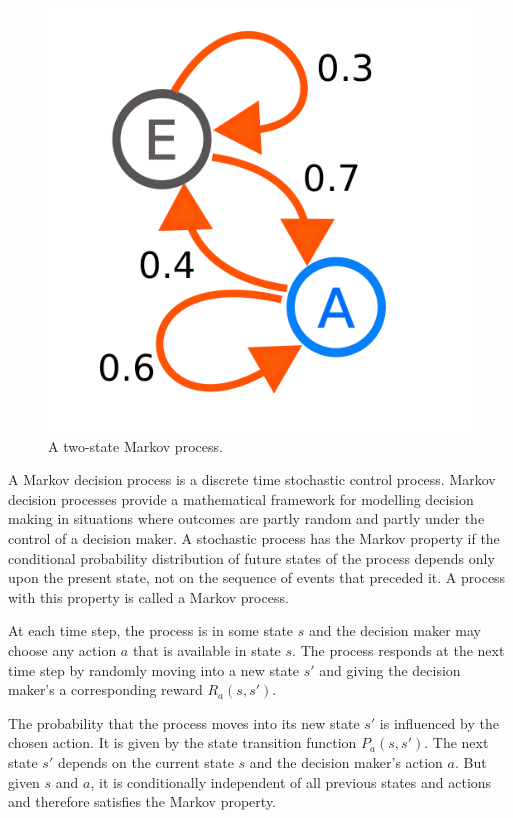 \documentclass[]{article}
\begin{document}
\begin{figure}[H]
	\includegraphics[scale=0.13]{markov}
	\centering
	\caption{A two-state Markov process.}
\end{figure}

A Markov decision process is a discrete time stochastic control process. Markov decision processes provide a mathematical framework for modelling decision making in situations where outcomes are partly random and partly under the control of a decision maker. A stochastic process has the Markov property if the conditional probability distribution of future states of the process depends only upon the present state, not on the sequence of events that preceded it. A process with this property is called a Markov process.

At each time step, the process is in some state $s$ and the decision maker may choose any action $a$ that is available in state $s$. The process responds at the next time step by randomly moving into a new state $s'$ and giving the decision maker's a corresponding reward $R_a(s, s')$.

The probability that the process moves into its new state $s'$ is influenced by the chosen action. It is given by the state transition function $P_a(s, s')$. The next state $s'$ depends on the current state $s$ and the decision maker's action $a$. But given $s$ and $a$, it is conditionally independent of all previous states and actions and therefore satisfies the Markov property. 
\end{document}
